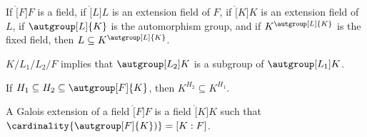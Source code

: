 \documentclass{article}                                                        %
\begin{document}
        \begin{theorem}
            If $\ring[F]{F}$ is a field, if $\ring[L]{L}$ is an extension field
            of $F$, if $\ring[K]{K}$ is an extension field of $L$, if
            $\autgroup[L]{K}$ is the automorphism group, and if
            $K^{\autgroup[L]{K}}$ is the fixed field, then
            $L\subseteq{K}^{\autgroup[L]{K}}$.
        \end{theorem}
        \begin{theorem}
            $K/L_{1}/L_{2}/F$ implies that $\autgroup[L_{2}]{K}$ is a subgroup
            of $\autgroup[L_{1}]{K}$.
        \end{theorem}
        \begin{theorem}
            If $H_{1}\subseteq{H}_{2}\subseteq\autgroup[F]{K}$, then
            $K^{H_{2}}\subseteq{K}^{H_{1}}$.
        \end{theorem}
        \begin{definition}
            A Galois extension of a field $\ring[F]{F}$ is a field $\ring[K]{K}$
            such that $\cardinality{\autgroup[F]{K})}=[K:F]$.
        \end{definition}
\end{document}
